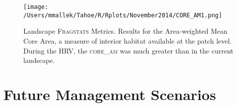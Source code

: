 \begin{figure}[!htbp]
  \centering
  \texttt{[image: /Users/mmallek/Tahoe/R/Rplots/November2014/CORE\_AM1.png]}
\caption{Landscape \textsc{Fragstats} Metrics. Results for the Area-weighted Mean Core Area, a measure of interior habitat available at the patch level. During the HRV, the \textsc{core\_am} was much greater than in the current landscape.} 
\label{fig:fragland_core}
\end{figure}


\section{Future Management Scenarios}